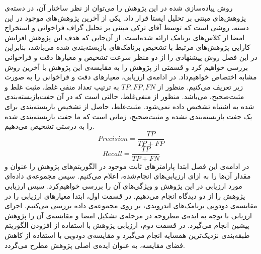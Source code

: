 
\label{result}
روش پیاده‌سازی شده در این پژوهش را می‌توان از نظر ساختار آن، در دسته‌ی پژوهش‌های مبتنی بر تحلیل ایستا قرار داد. یکی از آخرین پژوهش‌های موجود در این دسته، روشی است که توسط آقای ترکی مبتنی بر تحلیل گراف فراخوانی و استخراج امضا از کلاس‌های برنامک ارائه شده‌است. از آن‌جایی که هدف این پژوهش افزایش کارایی پژوهش‌های مرتبط با تشخیص برنامک‌های بازبسته‌بندی شده می‌باشد، بنابراین در این فصل روش پیشنهادی را از دو منظر سرعت تشخیص و معیار‌ها دقت و فراخوانی بررسی خواهیم کرد و قسمتی از پژوهش را به مقایسه‌ی این پژوهش با آخرین روش مشابه اختصاص خواهیم‌داد. در ادامه‌ی ارزیابی، معیار‌های دقت و فراخوانی را به صورت زیر تعریف می‌کنیم. منظور از $TP,FP,FN$ به ترتیب تعداد منفی‌ غلط، مثبت غلط و مثبت‌صحیح، می‌باشد. منظور از منفی‌غلط، حالتی است که در آن جفت‌بازبسته‌بندی شده به اشتباه تشخیص داده‌ نمی‌شود. مثبت‌غلط، حاصل از تشخیص بازبسته‌بندی برای یک جفت بازبسته‌بندی نشده و مثبت‌صحیح، زمانی است که ما جفت بازبسته‌بندی شده را به درستی تشخیص می‌دهیم.
\begin{equation}
	‫‪Precision‬‬	= \frac{TP}{TP+FP}
\end{equation}
\begin{equation}
		Recall = \frac{TP}{TP+FN}
\end{equation}
در ادامه‌ی این فصل ابتدا پارامتر‌های ثابت موجود در الگوریتم‌های پژوهش را عنوان و مقدار آن‌ها را به ازا‌ی ارزیابی‌های انجام‌شده، اعلام می‌کنیم. سپس مجموعه‌‌ی داده‌ای مورد ارزیابی در این پژوهش و ویژگی‌های آن را بررسی خواهیم‌کرد. سپس ارزیابی پژوهش را از دو دیدگاه انجام می‌دهیم. در قسمت اول، ابتدا معیار‌های ارزیابی را در مقایسه‌ی دودویی برنامک‌های اندرویدی، بر روی مجموعه‌ی داده بررسی می‌کنیم. اجرای ارزیابی با توجه به ایده‌ی مطروحه در مرحله‌ی تشکیل امضا و مقایسه‌ی آن را پژوهش پیشین انجام می‌گیرد. در قسمت دوم، ارزیابی پژوهش با استفاده از افزودن الگوریتم‌ طبقه‌بندی نزدیک‌ترین همسایه انجام می‌گیرد و مقایسه‌ی دودویی با استفاده از کاهش فضای مقایسه‌، به عنوان ایده‌ی اصلی پژوهش مطرح می‌گردد.

